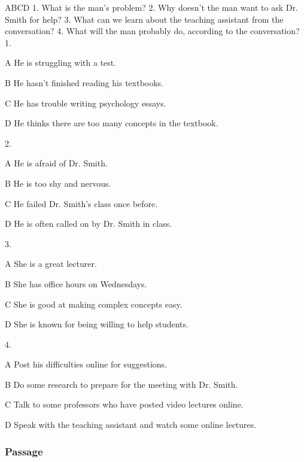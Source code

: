 \begin{enumerate}
	ABCD
	1. What is the man's problem?
	2. Why doesn't the man want to ask Dr. Smith for help?
	3. What can we learn about the teaching assistant from the conversation?
	4. What will the man probably do, according to the conversation?
	1.
	
	A
	He is struggling with a test.
	
	B
	He hasn't finished reading his textbooks.
	
	C
	He has trouble writing psychology essays.
	
	D
	He thinks there are too many concepts in the textbook.
	
	2.
	
	A
	He is afraid of Dr. Smith.
	
	B
	He is too shy and nervous.
	
	C
	He failed Dr. Smith's class once before.
	
	D
	He is often called on by Dr. Smith in class.
	
	3.
	
	A
	She is a great lecturer.
	
	B
	She has office hours on Wednesdays.
	
	C
	She is good at making complex concepts easy.
	
	D
	She is known for being willing to help students.
	
	4.
	
	A
	Post his difficulties online for suggestions.
	
	B
	Do some research to prepare for the meeting with Dr. Smith.
	
	C
	Talk to some professors who have posted video lectures online.
	
	D
	Speak with the teaching assistant and watch some online lectures.
\end{enumerate}


\subsubsection{Passage}

